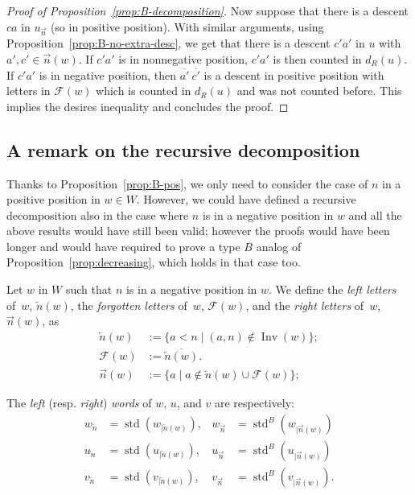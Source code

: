 \documentclass[Unicode]{cedram-alco}
\theoremstyle{definition}
\DeclareMathOperator{\std}{std}
\newcommand{\rest}[2]{#1_{|#2}}
\newcommand{\srest}[2]{\std(#1_{|#2})}
\DeclareMathOperator{\invs}{Inv}
\newcommand{\R}{{\overrightarrow{n}}}
\newcommand{\LL}{{\overleftarrow{n}}}
\newcommand{\dd}{d_R}
\newcommand{\Bstd}{\std^{B}}
\newcommand{\Bsrest}[2]{\Bstd(\rest{#1}{#2})}
\newcommand{\F}{\mathcal{F}}
\begin{document}
\begin{proof}[Proof of Proposition~\ref{prop:B-decomposition}]
Now suppose that there is a descent $ca$ in $u_\R$ (so in positive position). With similar arguments, using Proposition~\ref{prop:B-no-extra-desc}, we get that there is a descent $c'a'$ in $u$ with $a',c' \in \R(w)$. If $c'a'$ is in nonnegative position,  $c'a'$ is then counted in $\dd(u)$. If $c'a'$ is in negative position, then $\overline{a'}~\overline{c'}$ is a descent in positive position with letters in $\F(w)$ which is counted in $\dd(u)$ and was not counted before. This implies the desires inequality and concludes the proof.
\end{proof}


\subsection{A remark on the recursive decomposition}

Thanks to Proposition~\ref{prop:B-pos}, we only need to consider the case of $n$ in a positive position in $w\in W$. However, we could have defined a recursive decomposition also in the case where $n$ is in a negative position in $w$ and all the above results would have still been valid; however the proofs would have been longer and would have required to prove a type $B$ analog of Proposition~\ref{prop:decreasing}, which holds in that case too.

\begin{defi} Let $w$ in $W$ such that $n$ is in a negative position in $w$. We define the \emph{left letters} of~$w$, $\LL(w)$, the \emph{forgotten letters} of~$w$, $\F(w)$, and the \emph{right letters} of~$w$, $\R(w)$,  as
\begin{align*}
\LL(w) &:= \lbrace a < n \mid (a,n) \not\in \invs(w) \rbrace; \\
\F(w) &:= \overline{\LL(w)}. \\
\R(w) &:= \lbrace a \mid a \not\in \LL(w) \cup \F(w) \rbrace;
\end{align*}

The {\em left} (resp. {\em right}) {\em words} of $w$, $u$, and $v$ are respectively:
\begin{align*}
w_\LL &= \srest{w}{\LL(w)}, & w_\R &= \Bsrest{w}{\R(w)} \\
u_\LL &= \srest{u}{\LL(w)}, & u_\R &= \Bsrest{u}{\R(w)} \\
v_\LL &= \srest{v}{\LL(w)}, & v_\R &= \Bsrest{v}{\R(w)}. 
\end{align*}
\end{defi}
\end{document}
